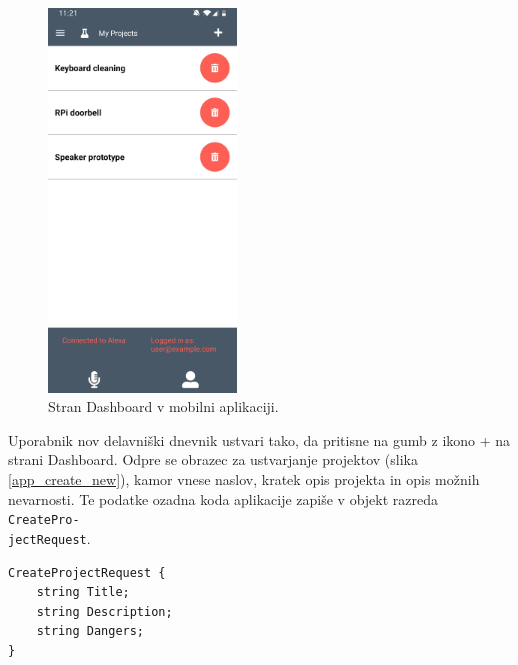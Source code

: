 \documentclass[a4paper, 12pt]{book}
\begin{document}
\begin{figure}[H]
\begin{center}
\includegraphics[width=5cm]{app_alexa_yes_small}
\end{center}
	\caption{Stran Dashboard v mobilni aplikaciji.}
\label{app_dashboard_first}
\end{figure}




Uporabnik nov delavniški dnevnik ustvari tako, da pritisne na gumb z ikono + na strani Dashboard.
Odpre se obrazec za ustvarjanje projektov (slika \ref{app_create_new}), kamor vnese naslov, kratek opis projekta in opis možnih nevarnosti.
Te podatke ozadna koda aplikacije zapiše v objekt razreda \texttt{CreatePro-\\jectRequest}.

\begin{verbatim}
CreateProjectRequest { 
    string Title;  
    string Description; 
    string Dangers; 
} 
\end{verbatim}
\end{document}
